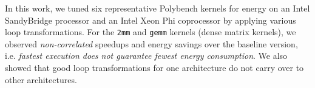 In this work, we tuned six representative Polybench kernels for energy on
an Intel SandyBridge processor and an Intel Xeon Phi coprocessor by applying various loop 
transformations. For the \texttt{2mm} and \texttt{gemm} kernels (dense matrix kernels),
we observed \emph{non-correlated} speedups and energy savings over the baseline version,
i.e. \emph{fastest execution does not guarantee fewest energy consumption}. 
We also showed that good loop transformations for one architecture do not carry over to
other architectures.

